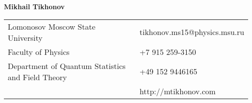 \documentclass[letterpaper,10pt,oneside,utf8]{article}
\begin{document}
	
	
	\noindent  \LARGE{\textbf{Mikhail Tikhonov}}  \\
	\vspace{-2ex}
	\normalsize
	
	
	
	\begin{center}
		\begin{tabular}{l l}
			Lomonosov Moscow State University   & \hspace{1in} 
			{tikhonov.ms15@physics.msu.ru} \\
			Faculty of Physics   & \hspace{1in} +7 915 259-3150 \\
			Department of Quantum Statistics and Field Theory         &\hspace{1in} +49 152 9446165  \\
			 & \hspace{1in} http://mtikhonov.com \\
		\end{tabular}
	\end{center}
	
	\vspace{1em}
	
	
\end{document}
